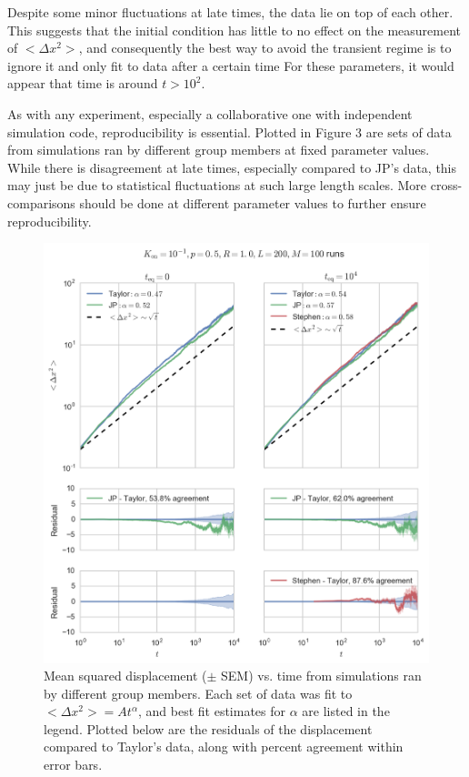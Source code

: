 \documentclass[12pt]{article}
\begin{document}
Despite some minor fluctuations at late times, the data lie on top of each other.
This suggests that the initial condition has little to no effect on the measurement of $<\Delta x^2>$, and consequently the best way to avoid the transient regime is to ignore it and only fit to data after a certain time 
For these parameters, it would appear that time is around $t > 10^2$.

As with any experiment, especially a collaborative one with independent simulation code, reproducibility is essential.
Plotted in Figure 3 are sets of data from simulations ran by different group members at fixed parameter values.
While there is disagreement at late times, especially compared to JP's data, this may just be due to statistical fluctuations at such large length scales.
More cross-comparisons should be done at different parameter values to further ensure reproducibility.

\begin{figure}[h!]
    \centering
    \includegraphics[width=0.8\linewidth]{../plots/group.png}
    \caption{Mean squared displacement ($\pm$ SEM) vs. time from simulations ran by different group members. Each set of data was fit to $<\Delta x^2> = A t^{\alpha}$, and best fit estimates for $\alpha$ are listed in the legend. Plotted below are the residuals of the displacement compared to Taylor's data, along with percent agreement within error bars.}
\end{figure}
\end{document}
